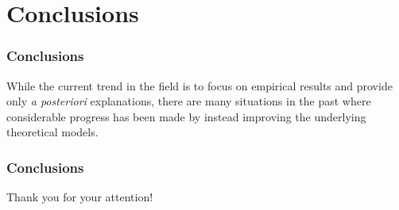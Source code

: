 \documentclass{beamer}
\theoremstyle{definition}
\begin{document}
\section{Conclusions}

\begin{frame}
\frametitle{Conclusions}

While the current trend in the field is to focus on empirical results and provide only \emph{a posteriori} explanations, there are many situations in the past where considerable progress has been made by instead improving the underlying theoretical models.
\end{frame}

\begin{frame}
\frametitle{Conclusions}
    \centering \Large
    Thank you for your attention!
\end{frame}
\end{document}
